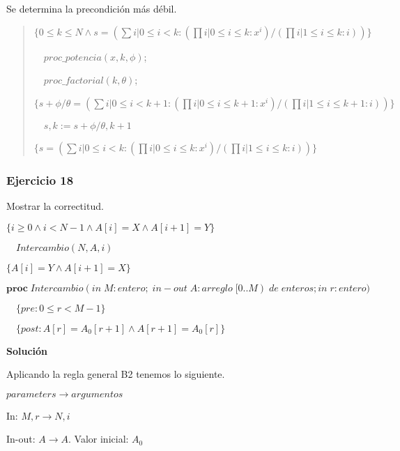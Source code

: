 \documentclass[hidelinks]{article}
\newenvironment{absolutelynopagebreak}
{\Needspace{10\baselineskip}\begin{quote}}
		{\end{quote}}
\begin{document}
Se determina la precondición más débil.\par

\begin{absolutelynopagebreak}
	$\{0 \leq k \leq N \land s = (\sum i| 0 \leq i < k: (\prod i| 0 \leq i \leq k : x^i) / (\prod i| 1 \leq i \leq k : i))\}$ \par
	$\quad proc\_potencia(x,k,\phi)$; \par
	$\quad proc\_factorial(k,\theta)$; \par
	$\{ s + \phi/\theta = (\sum i| 0 \leq i < k + 1: (\prod i| 0 \leq i \leq k + 1 : x^i) / (\prod i| 1 \leq i \leq k + 1 : i))\}$ \par
	$\quad s,k := s + \phi/\theta, k + 1$ \par
	$\{ s = (\sum i| 0 \leq i < k: (\prod i| 0 \leq i \leq k : x^i) / (\prod i| 1 \leq i \leq k : i))\}$ \par
\end{absolutelynopagebreak}

\newpage

\subsubsection{Ejercicio 18}


Mostrar la correctitud.\par
$\{ i \geq 0 \land i < N - 1 \land A[i] = X \land A[i+1] = Y\}$\par
$\quad Intercambio(N,A,i)$\par
$\{ A[i] = Y \land A[i + 1] = X\}$\par

$\textbf{proc} \; Intercambio(in \; M: entero; \; in-out \; A: arreglo \; [0..M) \; de \; enteros; in \; r: entero)$ \par
$\quad \{pre: 0 \leq r < M - 1\}$ \par
$\quad \{post: A[r] = A_0[r + 1] \land A[r + 1] = A_0[r]\}$\par

\textbf{Solución}\par

Aplicando la regla general B2 tenemos lo siguiente.\par

\hspace{5em} $parameters \rightarrow argumentos$\par

In: $M, r \rightarrow N, i$\par
In-out: $A \rightarrow A$. Valor inicial: $A_0$\par
\end{document}
